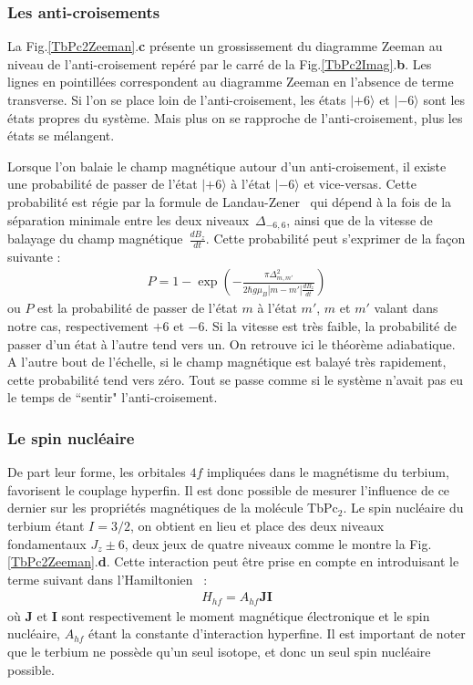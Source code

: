 \subsubsection{Les anti-croisements}
La Fig.\ref{TbPc2Zeeman}.\textbf{c} présente un grossissement du diagramme Zeeman au niveau de l'anti-croisement repéré par le carré de la Fig.\ref{TbPc2Imag}.\textbf{b}. Les lignes en pointillées correspondent au diagramme Zeeman en l'absence de terme transverse. Si l'on se place loin de l'anti-croisement, les états $|+6\rangle$ et $|-6\rangle$ sont les états propres du système. Mais plus on se rapproche de l'anti-croisement, plus les états se mélangent.

Lorsque l'on balaie le champ magnétique autour d'un anti-croisement, il existe une probabilité de passer de l'état $|+6\rangle$ à l'état $|-6\rangle$ et vice-versas. Cette probabilité est régie par la formule de Landau-Zener~\cite{Zener1932} qui dépend à la fois de la séparation minimale entre les deux niveaux~$\Delta_{-6,6}$, ainsi que de la vitesse de balayage du champ magnétique~$\frac{dB_z}{dt}$. Cette probabilité peut s'exprimer de la façon suivante :
\begin{eqnarray}
P = 1 - \exp \left( -\frac{\pi \Delta^2_{m,m'}}{2 \hbar g \mu_B |m-m'|\frac{dB_z}{dt}} \right)
\label{LandauZener}
\end{eqnarray}
ou $P$ est la probabilité de passer de l'état $m$ à l'état $m'$, $m$ et $m'$ valant dans notre cas, respectivement $+6$ et $-6$. Si la vitesse est très faible, la probabilité de passer d'un état à l'autre tend vers un. On retrouve ici le théorème adiabatique. A l'autre bout de l'échelle, si le champ magnétique est balayé très rapidement, cette probabilité tend vers zéro. Tout se passe comme si le système n'avait pas eu le temps de ``sentir" l'anti-croisement.




\subsubsection{Le spin nucléaire}
De part leur forme, les orbitales $4f$ impliquées dans le magnétisme du terbium, favorisent le couplage hyperfin. Il est donc possible de mesurer l'influence de ce dernier sur les propriétés magnétiques de la molécule TbPc$_{2}$. Le spin nucléaire du terbium étant $I = 3/2$, on obtient en lieu et place des deux niveaux fondamentaux $J_z \pm 6$, deux jeux de quatre niveaux comme le montre la Fig.\ref{TbPc2Zeeman}.\textbf{d}. Cette interaction peut être prise en compte en introduisant le terme suivant dans l'Hamiltonien~\cite{Bleaney1961} :
\begin{eqnarray}
H_{hf} = A_{hf}\mathbf{J}\mathbf{I}
\end{eqnarray}
où $\mathbf{J}$ et $\mathbf{I}$ sont respectivement le moment magnétique électronique et le spin nucléaire, $A_{hf}$ étant la constante d'interaction hyperfine. Il est important de noter que le terbium ne possède qu'un seul isotope, et donc un seul spin nucléaire possible.

